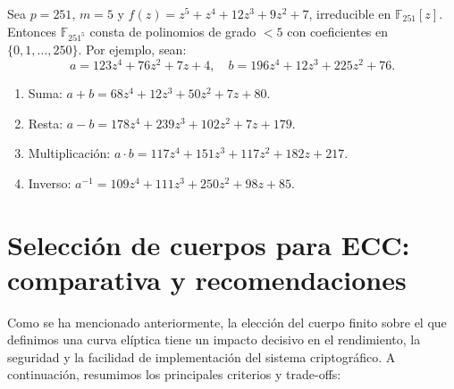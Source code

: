\begin{ejemplo}\label{ej:F_251_5}
Sea $p=251$, $m=5$ y $f(z)=z^5+z^4+12z^3+9z^2+7$, irreducible en $\mathbb{F}_{251}[z]$. Entonces $\mathbb{F}_{251^5}$ consta de polinomios de grado \(<5\) con coeficientes en $\{0,1,\dots,250\}$. Por ejemplo, sean:
\[
  a=123z^4+76z^2+7z+4,\quad b=196z^4+12z^3+225z^2+76.
\]
\begin{enumerate}
  \item Suma: $a+b=68z^4+12z^3+50z^2+7z+80.$
  \item Resta: $a-b=178z^4+239z^3+102z^2+7z+179.$
  \item Multiplicación: $a\cdot b=117z^4+151z^3+117z^2+182z+217.$
  \item Inverso: $a^{-1}=109z^4+111z^3+250z^2+98z+85.$
\end{enumerate}
\end{ejemplo}

\section{Selección de cuerpos para ECC: comparativa y recomendaciones}
\label{sec:seleccion-cuerpos-ecc}

Como se ha mencionado anteriormente, la elección del cuerpo finito sobre el que definimos una curva elíptica tiene un impacto decisivo en el rendimiento, la seguridad y la facilidad de implementación del sistema criptográfico. A continuación, resumimos los principales criterios y trade-offs:

